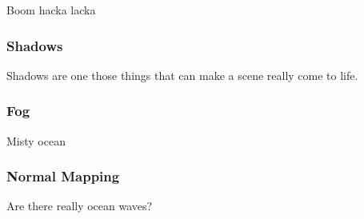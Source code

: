 Boom hacka lacka

\subsubsection{Shadows}
Shadows are one those things that can make a scene really come to life. 

\subsubsection{Fog}
Misty ocean

\subsubsection{Normal Mapping}
Are there really ocean waves?